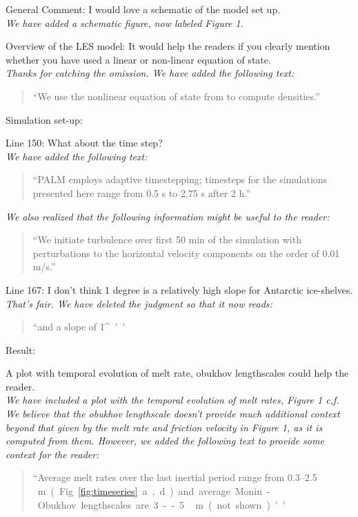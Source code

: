 \documentclass[tc, manuscript]{copernicus}
\begin{document}
General Comment: I would love a schematic of the model set up.\\
\textit{We have added a schematic figure, now labeled Figure 1.}\vspace{12pt}

Overview of the LES model: It would help the readers if you clearly mention whether you have used a linear or non-linear equation of state.\\
\textit{Thanks for catching the omission. We have added the following text:}
\begin{quote}
``We use the nonlinear equation of state from  \citet{jackett_algorithms_2006} to compute densities.''
\end{quote}\vspace{12pt}

Simulation set-up:\vspace{12pt}

Line 150: What about the time step?\\
\textit{We have added the following text:}
\begin{quote}
``PALM employs adaptive timestepping; timesteps for the simulations presented here range from 0.5 s to 2.75 s after 2 h.''
\end{quote}
\textit{We also realized that the following information might be useful to the reader:}
\begin{quote}
``We initiate turbulence over first 50 min of the simulation with perturbations to the horizontal velocity components on the order of 0.01 m/s.''
\end{quote}\vspace{12pt}

Line 167: I don’t think 1 degree is a relatively high slope for Antarctic ice-shelves.\\
\textit{That's fair. We have deleted the judgment so that it now reads:}
\begin{quote}
    ``and a slope of 1\unit{^{\circ}}''
\end{quote}\vspace{12pt}

Result:\vspace{12pt}

A plot with temporal evolution of melt rate, obukhov lengthscales could help the reader.\\
\textit{We have included a plot with the temporal evolution of melt rates, Figure 1 c,f. We believe that the obukhov lengthscale doesn't provide much additional context beyond that given by the melt rate and friction velocity in Figure 1, as it is computed from them. However, we added the following text to provide some context for the reader:}
\begin{quote}
    ``Average melt rates over the last inertial period range from 0.3--2.5\unit\,{m} (Fig. \ref{fig:timeseries}a,d) and average Monin-Obukhov lengthscales are 3--5\,\unit{m} (not shown).''
\end{quote}\vspace{12pt}
\end{document}
